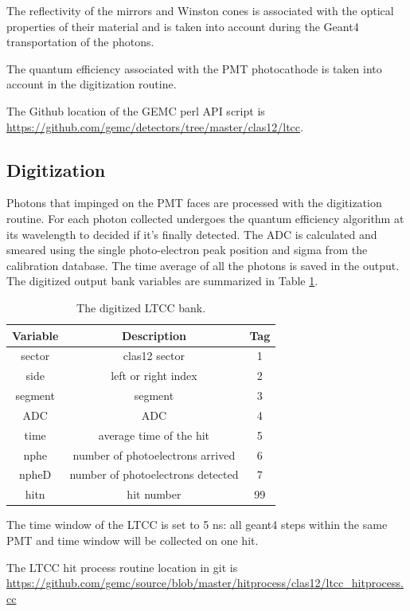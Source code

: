 The reflectivity of the mirrors and Winston cones is associated with the optical properties of their material and
is taken into account during the Geant4 transportation of the photons.

The quantum efficiency associated with the PMT photocathode is taken into account in
the digitization routine.

The Github location of the GEMC perl API script is  \url{https://github.com/gemc/detectors/tree/master/clas12/ltcc}.


\subsection{Digitization}

Photons that impinged on the PMT faces are processed with the digitization routine.
For each photon collected undergoes the quantum efficiency algorithm at its wavelength to decided if it's finally detected.
The ADC is calculated and smeared using the single photo-electron peak position and sigma from the calibration database.
The time average of all the photons is saved in the output.
The digitized output bank variables are summarized in Table \ref{tab:ltccBank}.

\begin{table}[h]
	\begin{center}
		\begin{tabular}{| c | c | c |}
			\hline \hline
			Variable    & Description                                        & Tag  \\
			\hline
             sector  &                                     clas12 sector  &    1 \\
               side  &                               left or right index  &    2 \\
            segment  &                                           segment  &    3 \\
                ADC  &                                               ADC  &    4 \\
               time  &                           average time of the hit  &    5 \\
               nphe  &                  number of photoelectrons arrived  &    6 \\
              npheD  &                 number of photoelectrons detected  &    7 \\
               hitn  &                                        hit number  &   99 \\
			\hline \hline
		\end{tabular}
	\end{center}
	\caption{The digitized LTCC bank.}\label{tab:ltccBank}
\end{table}

The time window  of the LTCC is set to 5 ns: all geant4 steps within the same PMT and time window will be collected on one hit.

The LTCC hit process routine location in git is \url{https://github.com/gemc/source/blob/master/hitprocess/clas12/ltcc_hitprocess.cc}
